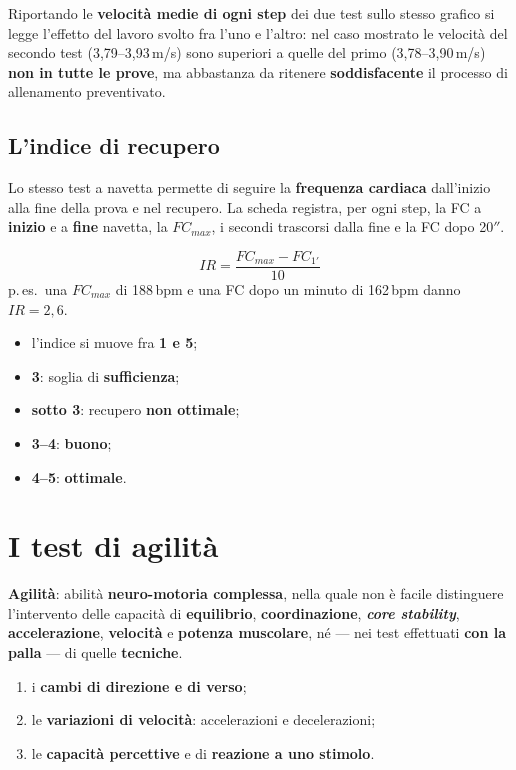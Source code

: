 Riportando le \textbf{velocità medie di ogni step} dei due test sullo stesso grafico si legge
l'effetto del lavoro svolto fra l'uno e l'altro: nel caso mostrato le velocità del secondo test
(3,79--3,93\,m/s) sono superiori a quelle del primo (3,78--3,90\,m/s) \textbf{non in tutte le
prove}, ma abbastanza da ritenere \textbf{soddisfacente} il processo di allenamento preventivato.

\subsection{L'indice di recupero}

Lo stesso test a navetta permette di seguire la \textbf{frequenza cardiaca} dall'inizio alla fine
della prova e nel recupero. La scheda registra, per ogni step, la FC a \textbf{inizio} e a
\textbf{fine} navetta, la $FC_{max}$, i secondi trascorsi dalla fine e la FC dopo 20$''$.

\[
  IR = \frac{FC_{max} - FC_{1'}}{10}
\]
p.\,es.\ una $FC_{max}$ di 188\,bpm e una FC dopo un minuto di 162\,bpm danno $IR = 2{,}6$.

\begin{itemize}
  \item l'indice si muove fra \textbf{1 e 5};
  \item \textbf{3}: soglia di \textbf{sufficienza};
  \item \textbf{sotto 3}: recupero \textbf{non ottimale};
  \item \textbf{3--4}: \textbf{buono};
  \item \textbf{4--5}: \textbf{ottimale}.
\end{itemize}

\section{I test di agilità}

\textbf{Agilità}: abilità \textbf{neuro-motoria complessa}, nella quale non è facile distinguere
l'intervento delle capacità di \textbf{equilibrio}, \textbf{coordinazione}, \textbf{\textit{core
stability}}, \textbf{accelerazione}, \textbf{velocità} e \textbf{potenza muscolare}, né --- nei test
effettuati \textbf{con la palla} --- di quelle \textbf{tecniche}.

\begin{enumerate}
  \item i \textbf{cambi di direzione e di verso};
  \item le \textbf{variazioni di velocità}: accelerazioni e decelerazioni;
  \item le \textbf{capacità percettive} e di \textbf{reazione a uno stimolo}.
\end{enumerate}

